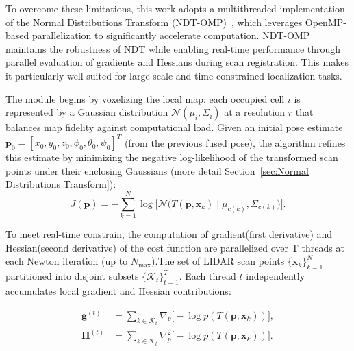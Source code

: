 To overcome these limitations, this work adopts a multithreaded implementation of the Normal Distributions Transform (NDT-OMP)~\cite{koide2019portable}, which leverages OpenMP-based parallelization to significantly accelerate computation. NDT-OMP maintains the robustness of NDT while enabling real-time performance through parallel evaluation of gradients and Hessians during scan registration. This makes it particularly well-suited for large-scale and time-constrained localization tasks.

%



The module begins by voxelizing the local map: each occupied cell \(i\) is represented by a Gaussian distribution \(\mathcal{N}(\mu_i,\Sigma_i)\) at a resolution \(r\) that balances map fidelity against computational load. Given an initial pose estimate \(\mathbf{p}_0 = [x_0,y_0,z_0,\phi_0,\theta_0,\psi_0]^T\) (from the previous fused pose), the algorithm refines this estimate by minimizing the negative log-likelihood of the transformed scan points under their enclosing Gaussians (more detail Section~\ref{sec:Normal Distributions Transform}):
\[
J(\mathbf{p}) = -\sum_{k=1}^N \log\bigl[\mathcal{N}\bigl(T(\mathbf{p},\mathbf{x}_k)\mid\mu_{c(k)},\Sigma_{c(k)}\bigr)\bigr].
\]


To meet real-time constrain, the computation of gradient(first derivative) and Hessian(second derivative) of the cost function are parallelized over T threads at each Newton iteration (up to \(N_{\max}\)).The set of LIDAR scan points \(\{\mathbf{x}_k\}_{k=1}^N\) partitioned into disjoint subsets \(\{\mathcal{K}_t\}_{t=1}^T\). Each thread \(t\) independently accumulates local gradient and Hessian contributions:

\begin{align}
	\label{eq:local-gradient}
	\mathbf{g}^{(t)}
	&= \sum_{k\in\mathcal{K}_t} \nabla_{\!p}\bigl[-\log p(T(\mathbf{p},\mathbf{x}_k))\bigr],\\
	\label{eq:local-hessian}
	\mathbf{H}^{(t)}
	&= \sum_{k\in\mathcal{K}_t} \nabla^2_{\!p}\bigl[-\log p(T(\mathbf{p},\mathbf{x}_k))\bigr].
\end{align}


